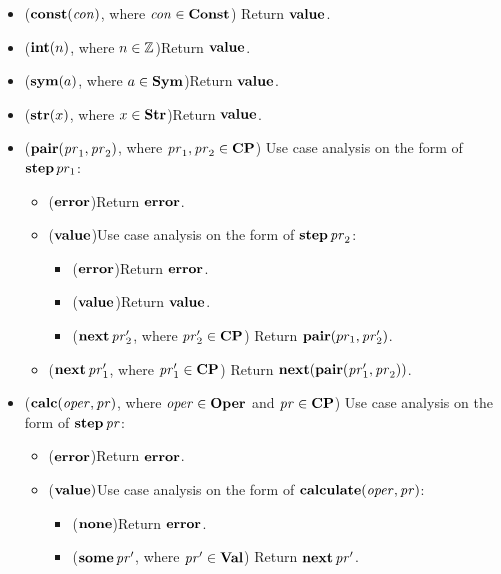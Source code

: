 \begin{itemize}
\item ($\mathbf{const}(\mathit{con})$, where $\mathit{con}\in\mathbf{Const}$)\quad
  Return $\mathbf{value}$.

\item ($\mathbf{int}(n)$, where $n\in\mathbb{Z}$)\quad Return $\mathbf{value}$.

\item ($\mathbf{sym}(a)$, where $a\in\mathbf{Sym}$)\quad Return $\mathbf{value}$.

\item ($\mathbf{str}(x)$, where $x\in\mathbf{Str}$)\quad Return $\mathbf{value}$.

\item ($\mathbf{pair}(\mathit{pr}_1,\mathit{pr}_2)$, where $\mathit{pr}_1,\mathit{pr}_2\in\mathbf{CP}$)\quad
  Use case analysis on the form of $\mathbf{step}\,pr_1$:
  \begin{itemize}
  \item ($\mathbf{error}$)\quad Return $\mathbf{error}$.

  \item ($\mathbf{value}$)\quad Use case analysis on the form of $\mathbf{step}\,\mathit{pr}_2$:
    \begin{itemize}
    \item ($\mathbf{error}$)\quad Return $\mathbf{error}$.

    \item ($\mathbf{value}$)\quad Return $\mathbf{value}$.

    \item ($\mathbf{next}\,\mathit{pr}'_2$, where $\mathit{pr}'_2\in\mathbf{CP}$)\quad
      Return $\mathbf{pair}(pr_1,\mathit{pr}'_2)$.
    \end{itemize}

  \item ($\mathbf{next}\,\mathit{pr}'_1$, where $\mathit{pr}'_1\in\mathbf{CP}$)\quad
    Return $\mathbf{next}(\mathbf{pair}(\mathit{pr}'_1,\mathit{pr}_2))$.
  \end{itemize}

\item ($\mathbf{calc}(\mathit{oper},\mathit{pr})$, where $\mathit{oper}\in\mathbf{Oper}$ and
  $\mathit{pr}\in\mathbf{CP}$)\quad
  Use case analysis on the form of $\mathbf{step}\,\mathit{pr}$:
  \begin{itemize}
  \item ($\mathbf{error}$)\quad Return $\mathbf{error}$.

  \item ($\mathbf{value})$\quad Use case analysis on the form of
    $\mathbf{calculate}(\mathit{oper}, \mathit{pr})$:
    \begin{itemize}
    \item ($\mathbf{none}$)\quad Return $\mathbf{error}$.

    \item ($\mathbf{some}\,\mathit{pr}'$, where $\mathit{pr}'\in\mathbf{Val}$)\quad
      Return $\mathbf{next}\,\mathit{pr}'$.
    \end{itemize}


\end{itemize}
\end{itemize}
